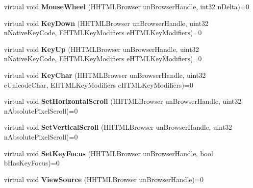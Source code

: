 \begin{DoxyCompactItemize}
\mbox{\label{class_i_steam_h_t_m_l_surface_a7b234824c28b9625b86736586878dd52}} 
virtual void {\bfseries Mouse\+Wheel} (H\+H\+T\+M\+L\+Browser un\+Browser\+Handle, int32 n\+Delta)=0
\item 
\mbox{\label{class_i_steam_h_t_m_l_surface_aa942c45c6905a6f092a6f2b2d5f6611a}} 
virtual void {\bfseries Key\+Down} (H\+H\+T\+M\+L\+Browser un\+Browser\+Handle, uint32 n\+Native\+Key\+Code, E\+H\+T\+M\+L\+Key\+Modifiers e\+H\+T\+M\+L\+Key\+Modifiers)=0
\item 
\mbox{\label{class_i_steam_h_t_m_l_surface_a6c7a4a2faf6a4d1938fc58af0368d99f}} 
virtual void {\bfseries Key\+Up} (H\+H\+T\+M\+L\+Browser un\+Browser\+Handle, uint32 n\+Native\+Key\+Code, E\+H\+T\+M\+L\+Key\+Modifiers e\+H\+T\+M\+L\+Key\+Modifiers)=0
\item 
\mbox{\label{class_i_steam_h_t_m_l_surface_aa93de957632e7fd281294013eee63639}} 
virtual void {\bfseries Key\+Char} (H\+H\+T\+M\+L\+Browser un\+Browser\+Handle, uint32 c\+Unicode\+Char, E\+H\+T\+M\+L\+Key\+Modifiers e\+H\+T\+M\+L\+Key\+Modifiers)=0
\item 
\mbox{\label{class_i_steam_h_t_m_l_surface_a4c8950ae7f524118fbde433c77339594}} 
virtual void {\bfseries Set\+Horizontal\+Scroll} (H\+H\+T\+M\+L\+Browser un\+Browser\+Handle, uint32 n\+Absolute\+Pixel\+Scroll)=0
\item 
\mbox{\label{class_i_steam_h_t_m_l_surface_a7f15a9fb1e164b74554c1a1800dde128}} 
virtual void {\bfseries Set\+Vertical\+Scroll} (H\+H\+T\+M\+L\+Browser un\+Browser\+Handle, uint32 n\+Absolute\+Pixel\+Scroll)=0
\item 
\mbox{\label{class_i_steam_h_t_m_l_surface_a4c3734b512aad5b5c992bfc37368ffa5}} 
virtual void {\bfseries Set\+Key\+Focus} (H\+H\+T\+M\+L\+Browser un\+Browser\+Handle, bool b\+Has\+Key\+Focus)=0
\item 
\mbox{\label{class_i_steam_h_t_m_l_surface_a2368589678c2f2d510bab360169a77a5}} 
virtual void {\bfseries View\+Source} (H\+H\+T\+M\+L\+Browser un\+Browser\+Handle)=0

\end{DoxyCompactItemize}
